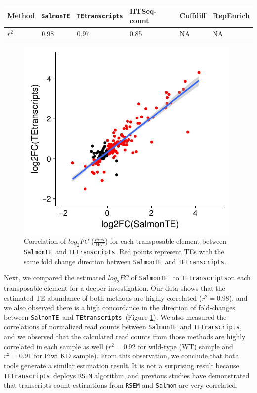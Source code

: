 \documentclass[wsdraft]{ws-procs11x85}
\newcommand{\TEtranscripts}{\texttt{TEtranscripts}}
\newcommand{\SalmonTE}{\texttt{SalmonTE}}
\begin{document}
\begin{table}[h]
{\begin{tabular}{l|lllll}
	\hline
	Method    & \SalmonTE & \TEtranscripts & HTSeq-count & Cuffdiff & RepEnrich  \\ \hline
	 $r^2$ & 0.98 & 0.97 & 0.85 & NA & NA \\ \hline
\end{tabular}}\label{aba:table_corr}
\end{table}

\begin{figure}[h]
\centerline{
\includegraphics[width=11cm]{figure_corr_FC}
}
\caption{Correlation of $log_{2}FC$ ($\frac{Piwi}{WT}$) for each transposable element between \SalmonTE~and \TEtranscripts. Red points represent TEs with the same fold change direction between \SalmonTE~and \TEtranscripts.}
\label{aba:fig2}
\end{figure}

Next, we compared the estimated $log_{2}FC$ of \SalmonTE~ to \TEtranscripts on each transposable element for a deeper investigation. Our data shows that the estimated TE abundance of both methods are highly correlated ($r^{2}=0.98$), and we also observed there is a high concordance in the direction of fold-changes between \SalmonTE~and \TEtranscripts~(Figure \ref{aba:fig2}). We also measured the correlations of normalized read counts between \SalmonTE~and \TEtranscripts, 
and we observed that the calculated read counts from those methods are highly correlated in each sample as well ($r^2=0.92$ for wild-type (WT) sample and $r^2=0.91$ for Piwi KD sample).
From this observation, we conclude that both tools generate a similar estimation result. 
It is not a surprising result because \TEtranscripts~deploys \texttt{RSEM} algorithm,\cite{li2011rsem} and previous studies have demonstrated that transcripts count estimations from \texttt{RSEM} and \texttt{Salmon} are very correlated.\cite{jin2017comprehensive,zhang2017evaluation}
\end{document}
